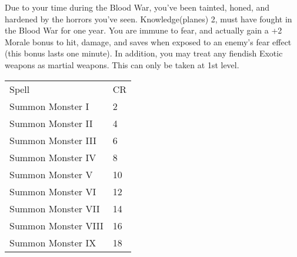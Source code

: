  {}
\descfeat
{Due to your time during the Blood War, you've been tainted, honed, and hardened by the horrors you've seen.}
{Knowledge(planes) 2, must have fought in the Blood War for one year.}
{You are immune to fear, and actually gain a +2 Morale bonus to hit, damage, and saves when exposed to an enemy's fear effect (this bonus lasts one minute). In addition, you may treat any fiendish Exotic weapons as martial weapons.}
{This can only be taken at 1st level.}

	\begin{small}
	\begin{tabular}{ll}
	Spell   &CR\\
	Summon Monster I    &2\\
	Summon Monster II   &4\\
	Summon Monster III  &6\\
	Summon Monster IV   &8\\
	Summon Monster V    &10\\
	Summon Monster VI   &12\\
	Summon Monster VII  &14\\
	Summon Monster VIII &16\\
	Summon Monster IX   &18\\
	\end{tabular}
	\end{small}\vspace{\baselineskip}
